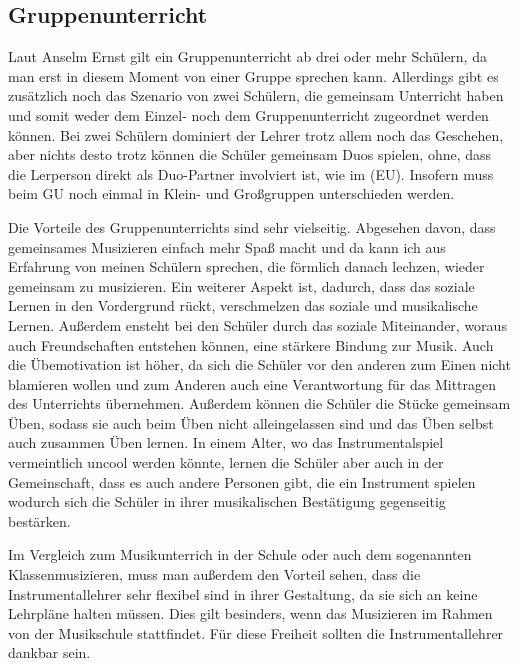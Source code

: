 \subsection{Gruppenunterricht} 
Laut Anselm Ernst gilt ein Gruppenunterricht ab drei oder mehr Schülern, da man
erst in diesem Moment von einer Gruppe sprechen kann.
\autocite[79]{ernst:die_zukunftsfaehige_musikschule}
Allerdings gibt es zusätzlich noch das Szenario von zwei Schülern, die gemeinsam
Unterricht haben und somit weder dem Einzel- noch dem Gruppenunterricht
zugeordnet werden können. Bei zwei Schülern dominiert der Lehrer trotz allem
noch das Geschehen, aber nichts desto trotz können die Schüler gemeinsam Duos
spielen, ohne, dass die Lerperson direkt als Duo-Partner involviert ist, wie im
(EU). Insofern muss beim GU noch einmal in Klein- und Großgruppen unterschieden
werden. 

Die Vorteile des Gruppenunterrichts sind sehr vielseitig. Abgesehen davon, dass
gemeinsames Musizieren einfach mehr Spaß macht und da kann ich aus Erfahrung von
meinen Schülern sprechen, die förmlich danach lechzen, wieder gemeinsam zu
musizieren. Ein weiterer Aspekt ist, dadurch, dass das soziale
Lernen in den Vordergrund rückt, verschmelzen das soziale und musikalische
Lernen. Außerdem ensteht bei den Schüler durch das soziale Miteinander, woraus
auch Freundschaften entstehen können, eine stärkere Bindung zur Musik. Auch die Übemotivation ist höher, da sich die Schüler vor den anderen
zum Einen nicht blamieren wollen und zum Anderen auch eine Verantwortung für das
Mittragen des Unterrichts übernehmen. Außerdem können die Schüler die Stücke
gemeinsam Üben, sodass sie auch beim Üben nicht alleingelassen sind und das Üben
selbst auch zusammen Üben lernen. In einem Alter, wo das Instrumentalspiel
vermeintlich uncool werden könnte, lernen die Schüler aber auch in der
Gemeinschaft, dass es auch andere Personen gibt, die ein Instrument spielen
wodurch sich die Schüler in ihrer musikalischen Bestätigung gegenseitig
bestärken. 

Im Vergleich zum Musikunterrich in der Schule oder auch dem sogenannten
Klassenmusizieren, muss man außerdem den Vorteil sehen, dass die
Instrumentallehrer sehr flexibel sind in ihrer Gestaltung, da sie sich an keine
Lehrpläne halten müssen. Dies gilt besinders, wenn das Musizieren im Rahmen von
der Musikschule stattfindet. Für diese Freiheit sollten die Instrumentallehrer dankbar sein.


